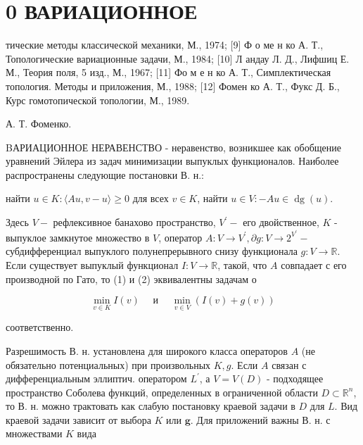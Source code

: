 \documentclass[10pt]{article}
\begin{document}
\section{0 ВАРИАЦИОННОЕ}

тические методы классической механики, М., 1974; [9] Ф о ме н ко А. Т., Топологические вариационные задачи, М., 1984; [10] Л андау Л. Д., Лифшиц Е. М., Теория поля, 5 изд., М., 1967; [11] Фо м е н ко А. Т., Симплектическая топология. Методы и приложения, М., 1988; [12] Фомен ко А. Т., Фукс Д. Б., Курс гомотопической топологии, М., 1989.



А. Т. Фоменко.



BАРИАЦИОННОЕ НЕРАВЕНСТВО - неравенство, возникшее как обобщение уравнений Эйлера из задач минимизации выпуклых функционалов. Наиболее распространены следующие постановки В. н.:



найти $u \in K:\langle A u, v-u\rangle \geqslant 0$ для всех $v \in K$, найти $u \in V:-A u \in \operatorname{dg}(u)$.



Здесь $V-$ рефлексивное банахово пространство, $V^{\prime}-$ его двойственное, $K$ - выпуклое замкнутое множество в $V$, оператор $A: V \rightarrow V^{\prime}, \partial g: V \rightarrow 2^{V^{\prime}}-$ субдифференциал выпуклого полунепрерывного снизу функционала $g: V \rightarrow \mathbb{R}$. Если существует выпуклый функционал $I: V \rightarrow \mathbb{R}$, такой, что $A$ совпадает с его производной по Гато, то (1) и (2) эквивалентны задачам о



\[

\min _{v \in K} I(v) \quad \text { и } \quad \min _{v \in V}(I(v)+g(v))

\]



соответственно.



Разрешимость В. н. установлена для широкого класса операторов $A$ (не обязательно потенциальных) при произвольных $K, g$. Если $A$ связан с дифференциальным эллиптич. оператором $L^{\prime}$, а $V=V(D)$ - подходящее пространство Соболева функций, определенных в ограниченной области $D \subset \mathbb{R}^{n}$, то В. н. можно трактовать как слабую постановку краевой задачи в $D$ для $L$. Вид краевой задачи зависит от выбора $K$ или $\boldsymbol{g}$. Для приложений важны В. н. с множествами $K$ вида
\end{document}
